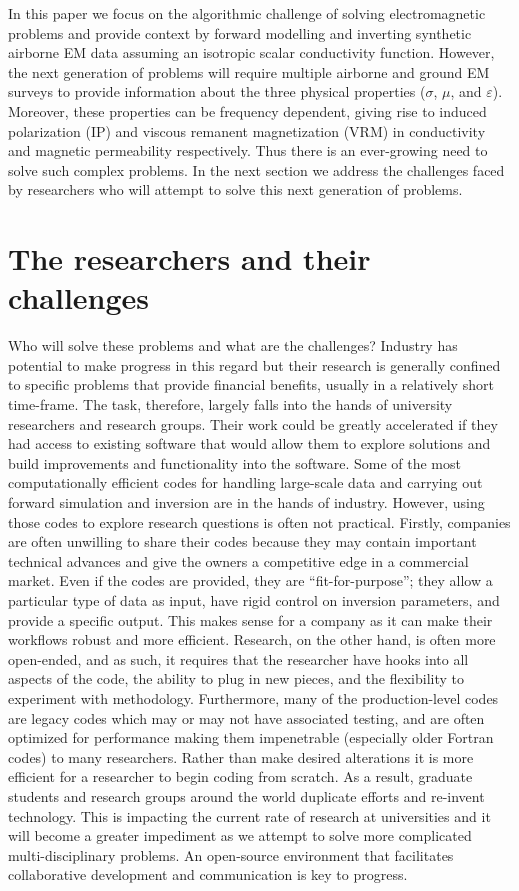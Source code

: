 \documentclass[paper]{geophysics}
\begin{document}
In this paper we focus on the algorithmic challenge of solving electromagnetic problems and provide context by forward modelling and inverting synthetic airborne EM data assuming an isotropic scalar conductivity function. However, the next generation of problems will require multiple airborne and ground EM surveys to provide information about the three physical properties ($\sigma$, $\mu$, and $\varepsilon$). Moreover, these properties can be frequency dependent, giving rise to induced polarization (IP) and viscous remanent magnetization (VRM)  in conductivity and magnetic permeability respectively. Thus there is an ever-growing need to solve such complex problems. In the next section we address the challenges faced by  researchers who will attempt to solve this next generation of problems.



\section{The researchers and their challenges}

Who will solve these problems and what are the challenges? Industry has potential to make progress in this regard but their research is generally confined to specific problems that provide financial benefits, usually in a relatively short time-frame. The task, therefore, largely falls into the hands of university researchers and research groups. Their work could be greatly accelerated if they had access to existing software that would allow them to explore solutions and build improvements and functionality into the software. Some of the most computationally efficient codes for handling large-scale data and carrying out forward simulation and inversion are in the hands of industry. However, using those codes to explore research questions is often not practical. Firstly, companies are often unwilling to share their codes because they may contain important technical advances and give the owners a competitive edge in a commercial market. Even if the codes are provided, they are ``fit-for-purpose''; they allow a particular type of data as input, have rigid control on inversion parameters, and provide a specific output. This makes sense for a company as it can make their workflows robust and more efficient. Research, on the other hand, is often more open-ended, and as such, it requires that the researcher have hooks into all aspects of the code, the ability to plug in new pieces, and the flexibility to experiment with methodology. Furthermore, many of the production-level codes are legacy codes which may or may not have associated testing, and are often optimized for performance making them impenetrable (especially older Fortran codes) to many researchers. Rather than make desired alterations it is more efficient for a researcher to begin coding from scratch. As a result, graduate students and research groups around the world duplicate efforts and re-invent technology. This is impacting the current rate of research at universities and it will become a greater impediment as we attempt to solve more complicated multi-disciplinary problems. An open-source environment that facilitates collaborative development and communication is key to progress.
\end{document}
